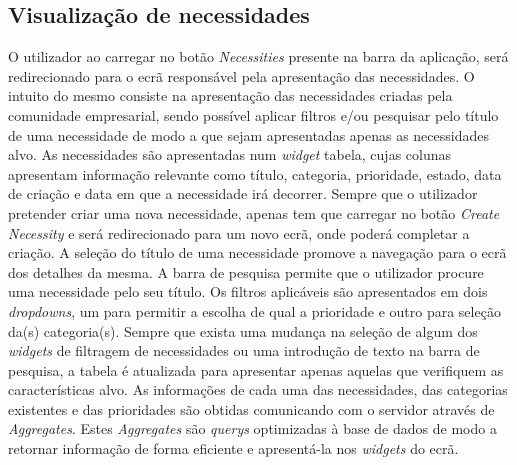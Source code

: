 \subsection{Visualização de necessidades}\label{subsec:implementacao:necessities}
O utilizador ao carregar no botão \textit{Necessities} presente na barra da aplicação, será redirecionado para o ecrã responsável pela apresentação das necessidades. 
O intuito do mesmo consiste na apresentação das necessidades criadas pela comunidade empresarial, sendo possível aplicar filtros e/ou pesquisar pelo título de uma necessidade de modo a que sejam apresentadas apenas as necessidades alvo.
As necessidades são apresentadas num \textit{widget} tabela, cujas colunas apresentam informação relevante como título, categoria, prioridade, estado, data de criação e data em que a necessidade irá decorrer. Sempre que o utilizador pretender criar uma nova necessidade, apenas tem que carregar no botão \textit{Create Necessity} e será redirecionado para um novo ecrã, onde poderá completar a criação.
A seleção do título de uma necessidade promove a navegação para o ecrã dos detalhes da mesma.
A barra de pesquisa permite que o utilizador procure uma necessidade pelo seu título.
Os filtros aplicáveis são apresentados em dois \textit{dropdowns}, um para permitir a escolha de qual a prioridade e outro para seleção da(s) categoria(s).
Sempre que exista uma mudança na seleção de algum dos \textit{widgets} de filtragem de necessidades ou uma introdução de texto na barra de pesquisa, a tabela é atualizada para apresentar apenas aquelas que verifiquem as características alvo. 
As informações de cada uma das necessidades, das categorias existentes e das prioridades são obtidas comunicando com o servidor através de \textit{Aggregates}. 
Estes \textit{Aggregates} são \textit{querys} optimizadas à base de dados de modo a retornar informação de forma eficiente e apresentá-la nos \textit{widgets} do ecrã.


